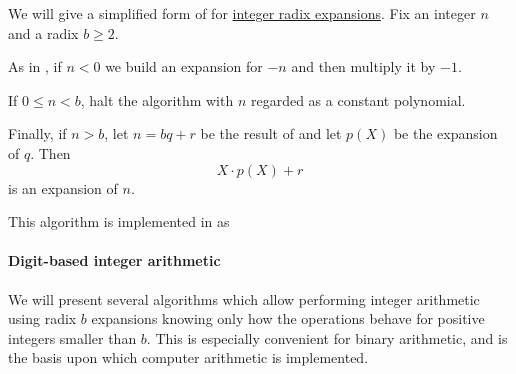 \begin{algorithm}\label{alg:integer_radix_expansion}
  We will give a simplified form of  for \hyperref[def:integer_radix_expansion]{integer radix expansions}. Fix an integer \( n \) and a radix \( b \geq 2 \).

  \begin{thmenum}
     As in , if \( n < 0 \) we build an expansion for \( -n \) and then multiply it by \( -1 \).

     If \( 0 \leq n < b \), halt the algorithm with \( n \) regarded as a constant polynomial.

     Finally, if \( n > b \), let \( n = bq + r \) be the result of  and let \( p(X) \) be the expansion of \( q \). Then
    \begin{equation*}
      X \cdot p(X) + r
    \end{equation*}
    is an expansion of \( n \).
  \end{thmenum}
\end{algorithm}
\begin{comments}
  \item This algorithm is implemented in \cite{notebook:code} as
  \begin{CodeRefDisplay}
  \end{CodeRefDisplay}
\end{comments}

\paragraph{Digit-based integer arithmetic}

We will present several algorithms which allow performing integer arithmetic using radix \( b \) expansions knowing only how the operations behave for positive integers smaller than \( b \). This is especially convenient for binary arithmetic, and is the basis upon which computer arithmetic is implemented.

